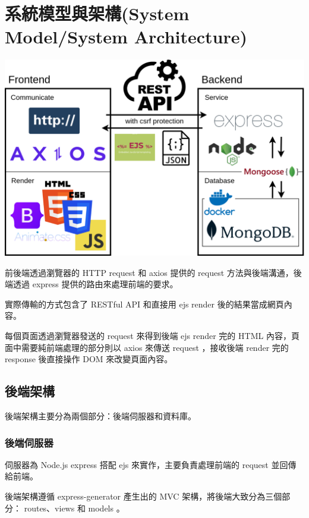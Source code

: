 \documentclass{article}
\begin{document}
\newpage

\section[系統模型與架構(SYSTEM MODEL/SYSTEM ARCHITECTURE)]{系統模型與架構(System Model/System Architecture)}

\centerline{\includegraphics[width=\textwidth]{HighLevelArchitecture.png}}

\bigskip

前後端透過瀏覽器的 HTTP request 和 axios 提供的 request 方法與後端溝通，後端透過 express 提供的路由來處理前端的要求。

實際傳輸的方式包含了 RESTful API 和直接用 ejs render 後的結果當成網頁內容。

每個頁面透過瀏覽器發送的 request 來得到後端 ejs render 完的 HTML 內容，頁面中需要純前端處理的部分則以 axios 來傳送 request ，接收後端 render 完的 response 後直接操作 DOM 來改變頁面內容。

\subsection{後端架構}

後端架構主要分為兩個部分：後端伺服器和資料庫。

\subsubsection{後端伺服器}

伺服器為 Node.js express 搭配 ejs 來實作，主要負責處理前端的 request 並回傳給前端。

後端架構遵循 express-generator 產生出的 MVC 架構，將後端大致分為三個部分： routes、views 和 models 。
\end{document}
